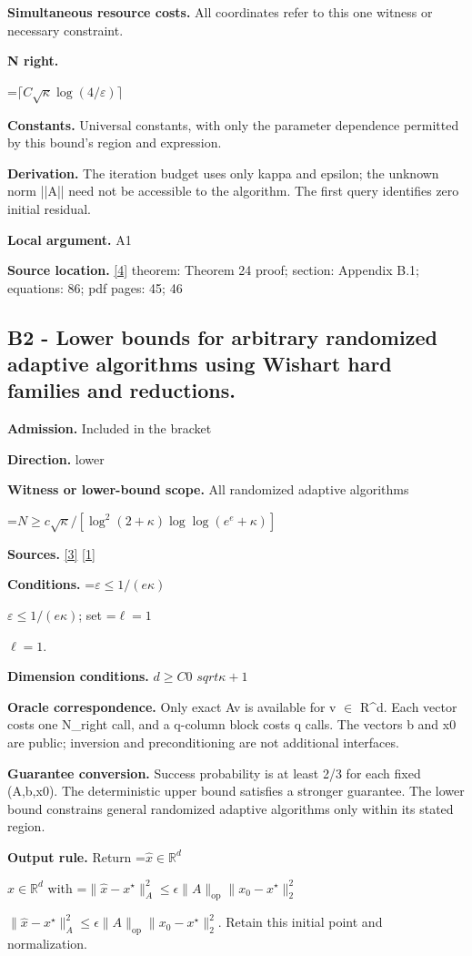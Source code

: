 \documentclass[10pt,a4paper]{article}
\newcommand{\AtlasMath}[1]{\par\begingroup\centering\setbox0=\hbox{$\displaystyle #1$}\ifdim\wd0>1.4\linewidth\typeout{ATLAS WIDE FORMULA: \the\wd0}\fi\ifdim\wd0>\linewidth\resizebox{\linewidth}{!}{\box0}\else\box0\fi\par\endgroup}
\newcommand{\AtlasInlineMath}[1]{\begingroup\setbox0=\hbox{$#1$}\ifdim\wd0>.4\linewidth\endgroup\AtlasMath{#1}\else\endgroup$#1$\fi}
\begin{document}
\textbf{Simultaneous resource costs.} All coordinates refer to this one witness or necessary constraint.

\textbf{N right.}

\AtlasMath{\lceil C\sqrt\kappa\log(4/\varepsilon)\rceil}
\textbf{Constants.} Universal constants, with only the parameter dependence permitted by this bound’s region and expression.

\textbf{Derivation.} The iteration budget uses only kappa and epsilon; the unknown norm ||A|| need not be accessible to the algorithm. The first query identifies zero initial residual.

\textbf{Local argument.} A1

\textbf{Source location.} \href{https://arxiv.org/pdf/1708.07788v2}{[4]} theorem: Theorem 24 proof; section: Appendix B.1; equations: 86; pdf pages: 45; 46

\subsection{B2 - Lower bounds for arbitrary randomized adaptive algorithms using Wishart hard families and reductions.}
\textbf{Admission.} Included in the bracket

\textbf{Direction.} lower

\textbf{Witness or lower-bound scope.} All randomized adaptive algorithms

\AtlasMath{N\ge c\sqrt{\kappa}/[\log^2(2+\kappa)\log\log(e^e+\kappa)]}
\textbf{Sources.} \href{https://jmlr.org/papers/volume26/24-1906/24-1906.pdf}{[3]} \href{https://proceedings.mlr.press/v125/braverman20a/braverman20a.pdf}{[1]}

\textbf{Conditions.} \AtlasInlineMath{\varepsilon\le1/(e\kappa)}; set \AtlasInlineMath{\ell=1}.

\textbf{Dimension conditions.} $d\ge C0$ $sqrt\kappa +1$

\textbf{Oracle correspondence.} Only exact Av is available for v $\in$ R\textasciicircum{}d. Each vector costs one N\_right call, and a q-column block costs q calls. The vectors b and x0 are public; inversion and preconditioning are not additional interfaces.

\textbf{Guarantee conversion.} Success probability is at least 2/3 for each fixed (A,b,x0). The deterministic upper bound satisfies a stronger guarantee. The lower bound constrains general randomized adaptive algorithms only within its stated region.

\textbf{Output rule.} Return \AtlasInlineMath{\widehat x\in\mathbb R^d} with \AtlasInlineMath{\|\widehat x-x^\star\|_A^2\le\epsilon\|A\|_{\mathrm{op}}\|x_0-x^\star\|_2^2}. Retain this initial point and normalization.
\end{document}
